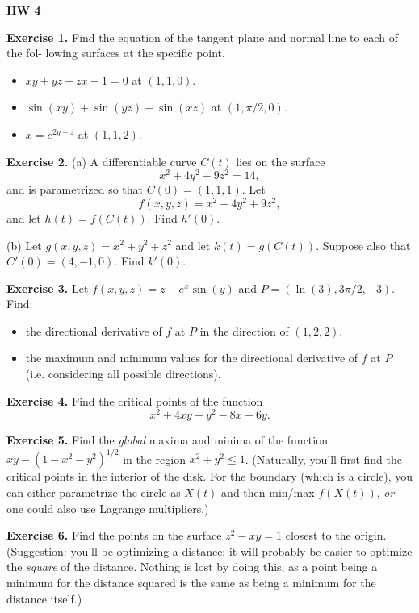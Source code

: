 \documentclass{article}
\begin{document}

\textbf{HW 4}

\textbf{Exercise 1.} Find the equation of the tangent plane and normal line to each of the fol-
lowing surfaces at the specific point.
\begin{itemize}
    \item $xy+yz+zx-1=0$ at $(1,1,0)$.
    \item $\sin(xy) + \sin(yz) + \sin(xz)$ at $(1,\pi/2,0)$.
    \item $x=e^{2y-z}$ at $(1,1,2)$.
\end{itemize}

\textbf{Exercise 2.} 
(a) A differentiable curve $C(t)$ lies on the surface
\[x^2 + 4y^2 + 9z^2 = 14,\]
and is parametrized so that $C(0) = (1,1,1)$. Let 
\[f(x,y,z) = x^2 + 4y^2 + 9z^2,\]
and let $h(t) = f(C(t))$. Find $h'(0)$.

(b) Let $g(x,y,z) = x^2 + y^2 + z^2$ and let $k(t) = g(C(t))$.
Suppose also that $C'(0)=(4,-1,0)$. Find $k'(0)$.

\textbf{Exercise 3.} 
Let $f(x,y,z) = z - e^x \sin(y)$ and $P=(\ln(3), 3\pi/2, -3)$.
Find:
\begin{itemize}
    \item the directional derivative of $f$ at $P$ in the direction of $(1,2,2)$.
    \item the maximum and minimum values for the directional derivative of $f$ at $P$ (i.e. considering all possible directions).
\end{itemize}

\textbf{Exercise 4.} 
Find the critical points of the function
\[x^2+4xy-y^2-8x-6y.\]

\textbf{Exercise 5.}
Find the \emph{global} maxima and minima of the function $xy - (1-x^2-y^2)^{1/2}$ in the region
$x^2+y^2 \leq 1$. (Naturally, you'll first find the critical points 
in the interior of the disk. For the boundary (which is a circle), you can either parametrize
the circle as $X(t)$ and then min/max $f(X(t))$, \emph{or} one could also
use Lagrange multipliers.)

\textbf{Exercise 6.} Find the points on the surface $z^2 - xy = 1$ closest to the origin.
(Suggestion: you'll be optimizing a distance; it will probably be easier to optimize the \emph{square}
of the distance. Nothing is lost by doing this, as a point being a minimum for the distance squared is the
same as being a minimum for the distance itself.)
\end{document}
